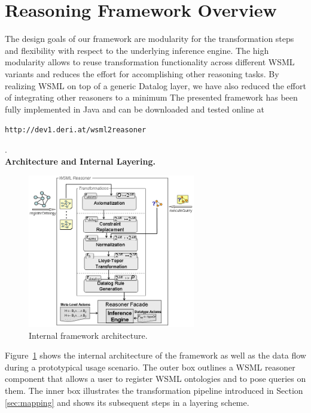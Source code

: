 \section{Reasoning Framework Overview\label{sec:framework}}
The design goals of our framework are modularity for the
transformation steps and flexibility with respect to the
underlying inference engine. The high modularity allows to reuse
transformation functionality across different WSML variants and
reduces the effort for accomplishing other reasoning tasks. By
realizing WSML on top of a generic Datalog layer, we have also
reduced the effort of integrating other reasoners to a
minimum
The presented framework has been fully implemented in Java and can
be downloaded and tested online at
\begin{small}{\tt http://dev1.deri.at/wsml2reasoner}\end{small}.\\[2mm]
{\bfseries Architecture and Internal Layering.}
\begin{figure}[tb]
    \includegraphics[width=0.65\textwidth]{figures/layering.png}
    \centering
    \caption{Internal framework architecture.
    \label{fig:layering}}\vspace{-5mm}
\end{figure}
Figure~\ref{fig:layering} shows the internal architecture of the
framework as well as the data flow during a prototypical usage
scenario. The outer box outlines a WSML reasoner component that
allows a user to register WSML ontologies and to pose queries on
them. The inner box illustrates the transformation pipeline
introduced in Section \ref{sec:mapping} and shows its subsequent
steps in a layering scheme.

